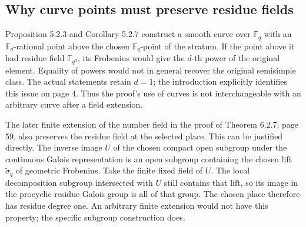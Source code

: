 \documentclass[10pt]{article}
\begin{document}
\subsection*{Why curve points must preserve residue fields}
Proposition 5.2.3 and Corollary 5.2.7 construct a smooth curve over \(\mathbb F_q\) with an \(\mathbb F_q\)-rational point above the chosen \(\mathbb F_q\)-point of the stratum. If the point above it had residue field \(\mathbb F_{q^d}\), its Frobenius would give the \(d\)-th power of the original element. Equality of powers would not in general recover the original semisimple class. The actual statements retain \(d=1\); the introduction explicitly identifies this issue on page 4. Thus the proof’s use of curves is not interchangeable with an arbitrary curve after a field extension.\par
The later finite extension of the number field in the proof of Theorem 6.2.7, page 59, also preserves the residue field at the selected place. This can be justified directly. The inverse image \(U\) of the chosen compact open subgroup under the continuous Galois representation is an open subgroup containing the chosen lift \(\widetilde\sigma_q\) of geometric Frobenius. Take the finite fixed field of \(U\). The local decomposition subgroup intersected with \(U\) still contains that lift, so its image in the procyclic residue Galois group is all of that group. The chosen place therefore has residue degree one. An arbitrary finite extension would not have this property; the specific subgroup construction does.\par
\end{document}
